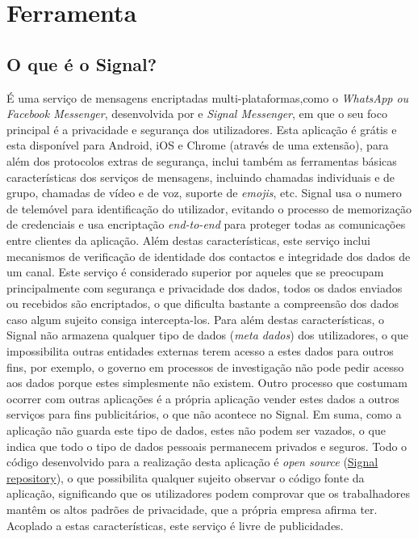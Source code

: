 \section{Ferramenta}

\vspace{-0.1cm}
\subsection{O que é o Signal?}
\label{sec:signal}

É uma serviço de mensagens encriptadas multi-plataformas,como o \textit{WhatsApp ou Facebook Messenger}, desenvolvida por  e \textit{Signal Messenger}, em que o seu foco principal é a privacidade e segurança dos utilizadores.
Esta aplicação é grátis e esta disponível para  Android, iOS e Chrome (através de uma extensão),
para além dos protocolos extras de segurança, inclui também as ferramentas básicas características dos serviços de mensagens, incluindo chamadas individuais e de grupo, chamadas de vídeo e de voz, suporte de \textit{emojis}, etc.\newline
Signal usa o numero de telemóvel para identificação do utilizador, evitando o processo de memorização de credenciais e usa encriptação \textit{end-to-end} para proteger todas as comunicações entre clientes da aplicação.\newline
Além destas características, este serviço inclui mecanismos de verificação de identidade dos contactos e integridade dos dados de um canal.\newline
Este serviço é considerado superior por aqueles que se preocupam principalmente com segurança e privacidade dos dados, todos os dados enviados ou recebidos são encriptados, o que dificulta bastante a compreensão dos dados caso algum sujeito consiga intercepta-los.
Para além destas características, o Signal não armazena qualquer tipo de dados (\textit{meta dados}) dos utilizadores, o que impossibilita outras entidades externas terem acesso a estes dados para outros fins, por exemplo, o governo em processos de investigação não pode pedir acesso aos dados porque estes simplesmente não existem. Outro processo que costumam ocorrer com outras aplicações é a própria aplicação vender estes dados a outros serviços para fins publicitários, o que não acontece no Signal. Em suma, como a aplicação não guarda este tipo de dados, estes não podem ser vazados, o que indica que todo o tipo de dados pessoais permanecem privados e seguros.\newline
Todo o código desenvolvido para a realização desta aplicação é \textit{open source} (\hyperlink{https://github.com/signalapp}{Signal repository}), o que possibilita qualquer sujeito observar o código fonte da aplicação, significando que os utilizadores podem comprovar que os trabalhadores mantêm os altos padrões de privacidade, que a própria empresa afirma ter. Acoplado a estas características, este serviço é livre de publicidades.

